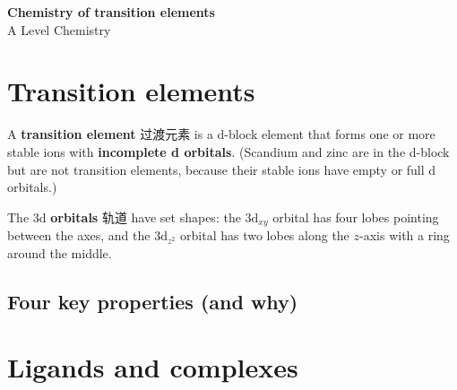 \documentclass[11pt]{article}
\begin{document}
\begin{center}
  {\LARGE\bfseries Chemistry of transition elements}\\[0.35em]
  {\large A Level Chemistry}
\end{center}
\vspace{0.6em}

\section*{Transition elements}

A \textbf{transition element} 过渡元素 is a d-block element that forms one or more stable ions with \textbf{incomplete d orbitals}. (Scandium and zinc are in the d-block but are not transition elements, because their stable ions have empty or full d orbitals.)

The 3d \textbf{orbitals} 轨道 have set shapes: the $3\text{d}_{xy}$ orbital has four lobes pointing between the axes, and the $3\text{d}_{z^2}$ orbital has two lobes along the $z$-axis with a ring around the middle.

\subsection*{Four key properties (and why)}

\begin{center}
\end{center}

\section*{Ligands and complexes}
\end{document}
